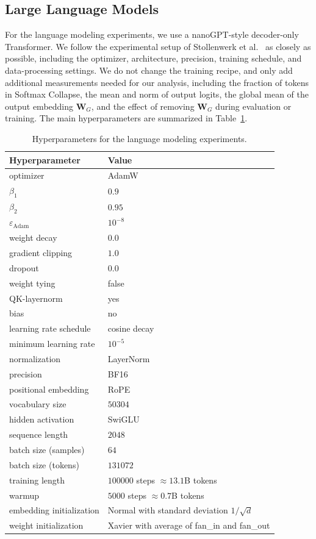 \documentclass{article}
\theoremstyle{plain}
\theoremstyle{definition}
\theoremstyle{remark}
\begin{document}
\newpage

\subsection{Large Language Models}


For the language modeling experiments, we use a nanoGPT-style decoder-only Transformer. 
We follow the experimental setup of Stollenwerk et al.~\cite{stollenwerk2026} as closely as possible, including the optimizer, architecture, precision, training schedule, and data-processing settings. 
We do not change the training recipe, and only add additional measurements needed for our analysis, including the fraction of tokens in Softmax Collapse, the mean and norm of output logits, the global mean of the output embedding $\bm{W}_G$, and the effect of removing $\bm{W}_G$ during evaluation or training. 
The main hyperparameters are summarized in Table~\ref{tab:llm_details}.

\begin{table}[H]
\centering
\caption{
Hyperparameters for the language modeling experiments. 
}
\label{tab:llm_details}
\begin{tabular}{ll}
\toprule
\textbf{Hyperparameter} & \textbf{Value} \\
\midrule
optimizer & AdamW \\
$\beta_1$ & $0.9$ \\
$\beta_2$ & $0.95$ \\
$\varepsilon_{\mathrm{Adam}}$ & $10^{-8}$ \\
weight decay & $0.0$ \\
gradient clipping & $1.0$ \\
dropout & $0.0$ \\
weight tying & false \\
QK-layernorm & yes \\
bias & no \\
learning rate schedule & cosine decay \\
minimum learning rate & $10^{-5}$ \\
normalization & LayerNorm \\
precision & BF16 \\
positional embedding & RoPE \\
vocabulary size & $50304$\\
hidden activation & SwiGLU \\
sequence length & $2048$  \\
batch size (samples) & $64$  \\
batch size (tokens) & $131072$ \\
training length & $100000$ steps $\approx 13.1$B tokens \\
warmup & $5000$ steps $\approx 0.7$B tokens \\
embedding initialization & Normal with standard deviation $1/\sqrt{d}$ \\
weight initialization & Xavier with average of fan\_in and fan\_out \\
 
\bottomrule
\end{tabular}
\end{table}



%
\end{document}
